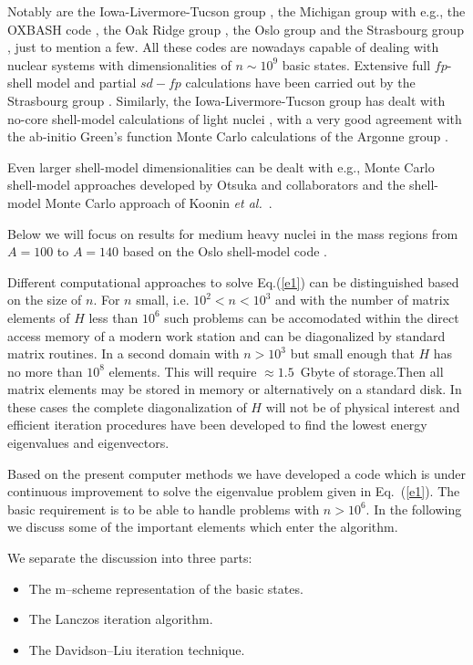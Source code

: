 \documentclass{article}
\begin{document}
Notably are 
the Iowa-Livermore-Tucson group \cite{petr_erich2002}, the Michigan group with e.g., the OXBASH code
\cite{alex,mihai1,mihai2},
the Oak Ridge group \cite{andrius}, the Oslo group
\cite{oslo1} and 
the Strasbourg group \cite{etienne1}, just to mention a few. 
All these codes are nowadays capable of 
dealing with nuclear systems with dimensionalities of $n \sim 10^{9}$ basic states.
Extensive full $fp$-shell model and partial $sd-fp$ 
calculations have been carried out by the Strasbourg group
\cite{etienne2,etienne3,etienne4,etienne6}. 
Similarly, the Iowa-Livermore-Tucson group has dealt with
no-core shell-model calculations of light nuclei \cite{bruce1,bruce2,bruce3,bruce4}, 
with a very good agreement with the 
ab-initio Green's function Monte Carlo calculations of the Argonne group \cite{bob1,bob2,bob3}. 

Even larger shell-model dimensionalities can be dealt with e.g., Monte Carlo shell-model
approaches developed by Otsuka and collaborators \cite{taka1,taka2,taka3} and the shell-model
Monte Carlo approach of Koonin {\em et al.}~\cite{r:smmc_pr}.

Below we will focus on results for medium heavy nuclei in the mass regions from
$A=100$ to $A=140$ based on the Oslo shell-model code \cite{oslo1}.


Different computational approaches to solve Eq.(\ref{e1}) can
be distinguished
based on the size of $n$.
For $n$ small, i.e. $10^2 < n < 10^3$ and with  the number of
matrix elements of $H$
less than $10^6$ such  problems can be accomodated within the direct
access memory of a modern work station and can be diagonalized by
standard matrix routines.
In a second domain  with  $ n > 10^3$ but small enough that $H$
has no more than $10^8$ elements. This will require $\approx 1.5$~Gbyte
of storage.Then all matrix elements may be stored in memory
or alternatively on a standard disk.
In these cases the complete diagonalization of
$H$ will not be of physical interest and efficient iteration
procedures have been developed to find the lowest energy eigenvalues
and eigenvectors.

Based on the present computer methods we have developed a code
which is under continuous improvement
to solve the eigenvalue problem given in Eq.~(\ref{e1}).
The basic requirement
is to be able to handle problems with $n > 10^6$. In the following
we discuss some of the important elements which enter the algorithm.

We separate the discussion into three parts:
%
\begin{itemize}
%
\item The m--scheme representation of the basic states.
%
\item The Lanczos iteration algorithm.
%
\item The Davidson--Liu iteration technique.
%
\end{itemize}
%
\end{document}
